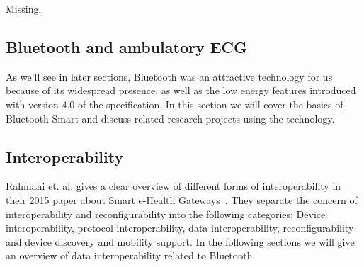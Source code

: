 Missing.


\subsection{Bluetooth and ambulatory ECG} %
\label{sub:bluetooth}

As we'll see in later sections, Bluetooth was an attractive technology for us because of its widespread presence, as well as the low energy features introduced with version 4.0 of the specification. In this section we will cover the basics of Bluetooth Smart and discuss related research projects using the technology.






\subsection{Interoperability} %
\label{sub:interoperability}

Rahmani et. al. gives a clear overview of different forms of interoperability in their 2015 paper about Smart e-Health Gateways~\cite{DrAmirMohammadRahmani:2014vx}. They separate the concern of interoperability and reconfigurability into the following categories: Device interoperability, protocol interoperability, data interoperability, reconfigurability and device discovery and mobility support. In the following sections we will give an overview of data interoperability related to Bluetooth.

